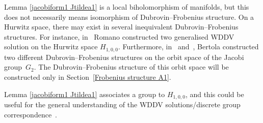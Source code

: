 \documentclass[pdftex]{sigma}%
\numberwithin{equation}{section}
\begin{document}
\begin{Remark}
Lemma \ref{jacobiform1 Jtildea1} is a local biholomorphism of manifolds, but this does not neces\-sa\-rily means isomorphism of Dubrovin--Frobenius structure. On a Hurwitz space, there may exist in several inequivalent Dubrovin--Frobenius structures. For instance, in~\cite{Romano2} Romano constructed two gene\-ra\-li\-sed WDDV solution on the Hurwitz space $H_{1,0,0}$. Furthermore, in~\cite{BertolaM.1} and~\cite{BertolaM.2}, Bertola constructed two different Dubrovin--Frobenius structures on the orbit space of the Jacobi group~$G_2$. The Dubrovin--Frobenius structure of this orbit space will be constructed only in Section~\ref{Frobenius structure A1}.
\end{Remark}

\begin{Remark}
Lemma \ref{jacobiform1 Jtildea1} associates a group to $H_{1,0,0}$, and this could be useful for the general understanding of the WDDV solutions/discrete group correspondence~\cite{B.Dubrovin2}.
\end{Remark}
\end{document}
